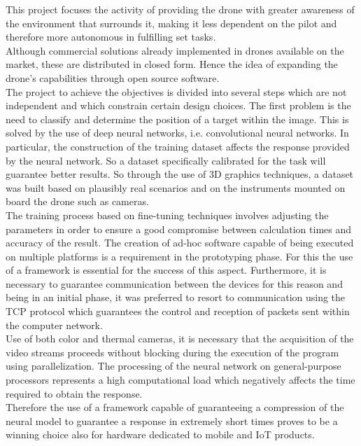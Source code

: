 \noindent This project focuses the activity of providing the drone with greater 
awareness of the environment that surrounds it, making it less dependent on the 
pilot and therefore more autonomous in fulfilling set tasks.\\
Although commercial solutions already implemented in drones available on the 
market, these are distributed in closed form.
Hence the idea of expanding the drone's capabilities through open source 
software.\\
The project to achieve the objectives is divided into several steps which are 
not independent and which constrain certain design choices.
The first problem is the need to classify and determine the position of a target
within the image. This is solved by the use of deep neural networks,
i.e. convolutional neural networks.
In particular, the construction of the training dataset affects the response 
provided by the neural network. 
So a dataset specifically calibrated for the task will guarantee better results.
So through the use of 3D graphics techniques, a dataset was built based on
plausibly real scenarios and on the instruments mounted on board the drone such
as cameras.\\
The training process based on fine-tuning techniques involves adjusting the
parameters in order to ensure a good compromise between calculation times and
accuracy of the result.
The creation of ad-hoc software capable of being executed on multiple platforms
is a requirement in the prototyping phase. For this the use of a framework is
essential for the success of this aspect.
Furthermore, it is necessary to guarantee communication between the devices for
this reason and being in an initial phase, it was preferred to resort to
communication using the TCP protocol which guarantees the control and reception
of packets sent within the computer network.\\ 
Use of both color and thermal cameras, it is necessary that the acquisition of 
the video streams proceeds without blocking during the execution of the program 
using parallelization.
The processing of the neural network on general-purpose processors represents a
high computational load which negatively affects the time required to obtain the
response.\\
Therefore the use of a framework capable of guaranteeing a compression of the
neural model to guarantee a response in extremely short times proves to be a
winning choice also for hardware dedicated to mobile and IoT products.\\



